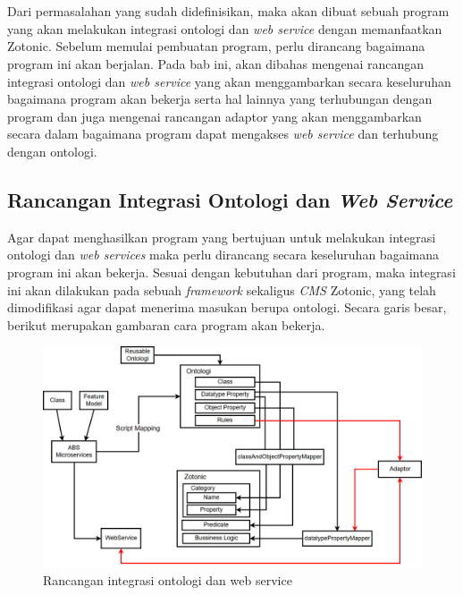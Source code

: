 \chapter{\babTiga}

Dari permasalahan yang sudah didefinisikan, maka akan dibuat sebuah program yang akan melakukan integrasi ontologi dan \textit{web service} dengan memanfaatkan Zotonic. Sebelum memulai pembuatan program, perlu dirancang bagaimana program ini akan berjalan. Pada bab ini, akan dibahas mengenai rancangan integrasi ontologi dan \textit{web service} yang akan menggambarkan secara keseluruhan bagaimana program akan bekerja serta hal lainnya yang terhubungan dengan program dan juga mengenai rancangan adaptor yang akan menggambarkan secara dalam bagaimana program dapat mengakses \textit{web service} dan terhubung dengan ontologi.
\section{Rancangan Integrasi Ontologi dan \textit{Web Service}}

Agar dapat menghasilkan program yang bertujuan untuk melakukan integrasi ontologi dan \textit{web services} maka perlu dirancang secara keseluruhan bagaimana program ini akan bekerja. Sesuai dengan kebutuhan dari program, maka integrasi ini akan dilakukan pada sebuah \textit{framework} sekaligus \textit{CMS} Zotonic, yang telah dimodifikasi agar dapat menerima masukan berupa ontologi. Secara garis besar, berikut merupakan gambaran cara program akan bekerja.

\begin{figure}
	\centering
	\includegraphics[width=1\textwidth]
		{pics/skripsiRoadmapNew.jpg}
	\caption{Rancangan integrasi ontologi dan web service}
	\label{fig:skripsiroadmap}
\end{figure}
\vspace{-0.3cm}

